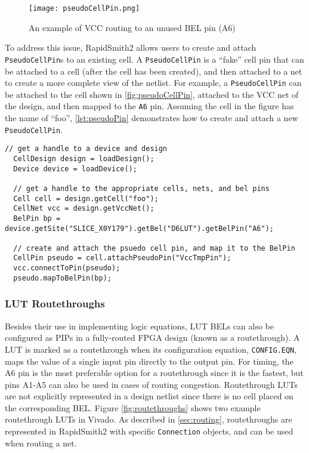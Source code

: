 \begin{figure}[t!]
  \centering
  \texttt{[image: pseudoCellPin.png]}
  \caption{An example of VCC routing to an unused BEL pin (A6)}
  \label{fig:pseudoCellPin}
\end{figure}

To address this issue, RapidSmith2 allows users to create and attach
\texttt{PseudoCellPin}s to an existing cell. A \texttt{PseudoCellPin} is a
``fake'' cell pin that can be attached to a cell (after the cell has been
created), and then attached to a net to create a more complete view of the 
netlist. For example, a \texttt{PseudoCellPin} can be attached to the cell shown
in \autoref{fig:pseudoCellPin}, attached to the VCC net of the design, and then
mapped to the \texttt{A6} pin. Assuming the cell in the figure has the name of
``foo'', \autoref{lst:pseudoPin} demonstrates how to create and attach a new
\texttt{PseudoCellPin}.

\begin{lstlisting}[xleftmargin=1.5em, framexleftmargin=1.5em, caption=Required
function calls to attach a PseudoPin to a Cell, label=lst:pseudoPin] 
  // get a handle to a device and design
  CellDesign design = loadDesign();
  Device device = loadDevice();
  
  // get a handle to the appropriate cells, nets, and bel pins
  Cell cell = design.getCell("foo");
  CellNet vcc = design.getVccNet();
  BelPin bp = device.getSite("SLICE_X0Y179").getBel("D6LUT").getBelPin("A6");
  
  // create and attach the psuedo cell pin, and map it to the BelPin
  CellPin pseudo = cell.attachPseudoPin("VccTmpPin");
  vcc.connectToPin(pseudo);
  pseudo.mapToBelPin(bp);
\end{lstlisting}

\subsubsection {LUT Routethroughs}
Besides their use in implementing logic equations, LUT BELs can also be
configured as PIPs in a fully-routed FPGA design (known as a routethrough). A
LUT is marked as a routethrough when its configuration equation,
\texttt{CONFIG.EQN}, maps the value of a single input pin directly to the
output pin. For timing, the A6 pin is the most preferable option for
a routethrough since it is the fastest, but pins A1-A5 can also be
used in cases of routing congestion. Routethrough LUTs are not explicitly
represented in a design netlist since there is no cell placed on the
corresponding BEL. Figure \ref{fig:routethroughs} shows two example routethrough
LUTs in Vivado. As described in \autoref{sec:routing}, routethroughs are
represented in RapidSmith2 with specific \texttt{Connection} objects, and can be
used when routing a net.

